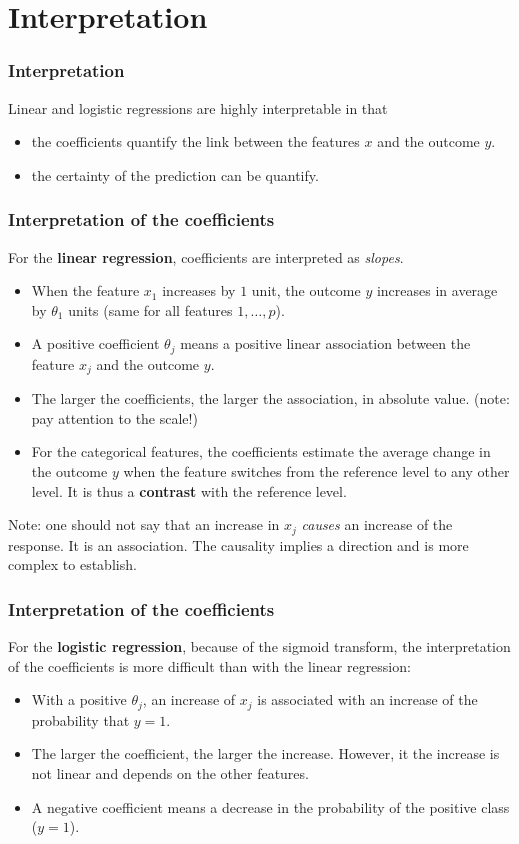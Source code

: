\section{Interpretation}
\begin{frame}
\frametitle{Interpretation}
Linear and logistic regressions are highly interpretable in that 
\begin{itemize}
\item the coefficients quantify the link between the features $x$ and the outcome $y$.
\item the certainty of the prediction can be quantify.
\end{itemize}
\end{frame}
\begin{frame}
\frametitle{Interpretation of the coefficients}
For the {\bf linear regression}, coefficients are interpreted as {\it slopes}.
\begin{itemize}
\item When the feature $x_1$ increases by $1$ unit, the outcome $y$ increases in average by $\theta_1$ units (same for all features $1,\ldots,p$).
\item A positive coefficient $\theta_j$ means a positive linear association between the feature $x_j$ and the outcome $y$.
\item The larger the coefficients, the larger the association, in absolute value. (note: pay attention to the scale!)
\item For the categorical features, the coefficients estimate the average change in the outcome $y$ when the feature switches from the reference level to any other level. It is thus a {\bf contrast} with the reference level.  
\end{itemize}
\small
Note: one should not say that an increase in $x_j$ {\it causes} an increase of the response. It is an association. The causality implies a direction and is more complex to establish.
\normalsize
\end{frame}
\begin{frame}
\frametitle{Interpretation of the coefficients}
For the {\bf logistic regression}, because of the sigmoid transform, the interpretation of the coefficients is more difficult than with the linear regression:
\begin{itemize}
\item With a positive $\theta_j$, an increase of $x_j$ is associated with an increase of the probability that $y=1$. 
\item The larger the coefficient, the larger the increase. However, it the increase is not linear and depends on the other features.
\item A negative coefficient means a decrease in the probability of the positive class ($y=1$).
\end{itemize}
\end{frame}
